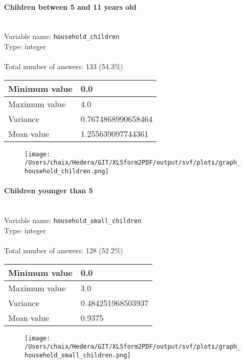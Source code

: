 \documentclass[11.5pt, a4paper]{scrartcl}
\begin{document}
\paragraph{Children between 5 and 11 years old}
\  \\Variable name: \texttt{household\_children}\\
Type: integer\\
\\Total number of answers: 133 (54.3\%)
\\[0.2em] \begin{tabular}{p{4cm}|p{8cm}}
Minimum value &0.0 \\
\hline
\cellcolor{mygray} Maximum value & \cellcolor{mygray}4.0 \\
\hline
Variance &0.7674868990658464 \\
\hline
\cellcolor{mygray} Mean value & \cellcolor{mygray}1.255639097744361 \\
\hline
\end{tabular}
\begin{figure}[H]
\centering
\texttt{[image: /Users/chaix/Hedera/GIT/XLSform2PDF/output/svf/plots/graph\_household\_children.png]}
\end{figure}
\paragraph{Children younger than 5}
\  \\Variable name: \texttt{household\_small\_children}\\
Type: integer\\
\\Total number of answers: 128 (52.2\%)
\\[0.2em] \begin{tabular}{p{4cm}|p{8cm}}
Minimum value &0.0 \\
\hline
\cellcolor{mygray} Maximum value & \cellcolor{mygray}3.0 \\
\hline
Variance &0.484251968503937 \\
\hline
\cellcolor{mygray} Mean value & \cellcolor{mygray}0.9375 \\
\hline
\end{tabular}
\begin{figure}[H]
\centering
\texttt{[image: /Users/chaix/Hedera/GIT/XLSform2PDF/output/svf/plots/graph\_household\_small\_children.png]}
\end{figure}
\end{document}
